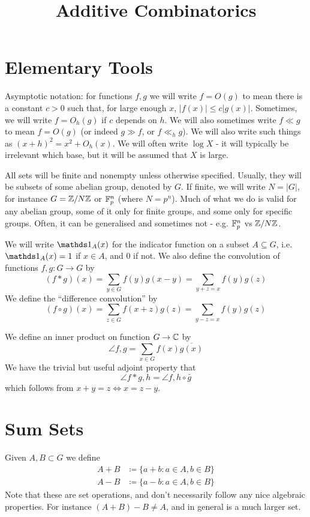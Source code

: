 \documentclass[10pt,a4paper]{article}
\title{Additive Combinatorics}
\begin{document}
\maketitle
\tableofcontents
\newpage
\setcounter{section}{-1}
\section{Elementary Tools}
Asymptotic notation: for functions $f, g$ we will write $f = O(g)$ to mean there is a constant $c > 0$ such that, for large enough $x$, $|f(x)| \leq c|g(x)|$. Sometimes, we will write $f = O_h(g)$ if $c$ depends on $h$. We will also sometimes write $f \ll g$ to mean $f=O(g)$ (or indeed $g \gg f$, or $f \ll_h g$). We will also write such things as $(x+h)^2 = x^2 + O_h(x)$. We will often write $\log X$ - it will typically be irrelevant which base, but it will be assumed that $X$ is large.

All sets will be finite and nonempty unless otherwise specified. Usually, they will be subsets of some abelian group, denoted by $G$. If finite, we will write $N = |G|$, for instance $G = \mathbb{Z}/N\mathbb{Z}$ or $\mathbb{F}_p^n$ (where $N = p^n$). Much of what we do is valid for any abelian group, some of it only for finite groups, and some only for specific groups. Often, it can be generalised and sometimes not - e.g. $\mathbb{F}_p^n$ vs $\mathbb{Z}/N\mathbb{Z}$.

We will write $\one_A(x)$ for the indicator function on a subset $A \subseteq G$, i.e. $\one_A(x) = 1$ if $x \in A$, and $0$ if not. We also define the convolution of functions $f, g:G \to G$ by \[(f \ast g)(x) = \sum_{y \in G}f(y)g(x-y) = \sum_{y+z=x}f(y)g(z)\]
We define the ``difference convolution'' by
\[(f \circ g)(x) = \sum_{z\in G}f(x+z)g(z) = \sum_{y-z = x}f(y)g(z)\]

We define an inner product on function $G \to \mathbb{C}$ by
\[\angle{f,g} = \sum_{x\in G}f(x)\overline{g(x)}\]
We have the trivial but useful adjoint property that
\[\angle{f\ast g, h} = \angle{f, h \circ \bar{g}}\]
which follows from $x+y=z \iff x = z-y$.

\section{Sum Sets}
Given $A, B \subset G$ we define
\begin{align*}
  A+B &\coloneqq \{a+b : a \in A, b\in B\}\\
  A-B &\coloneqq \{a-b : a \in A, b\in B\}
\end{align*}
Note that these are set operations, and don't necessarily follow any nice algebraic properties. For instance $(A+B)-B \neq A$, and in general is a much larger set.
\end{document}
